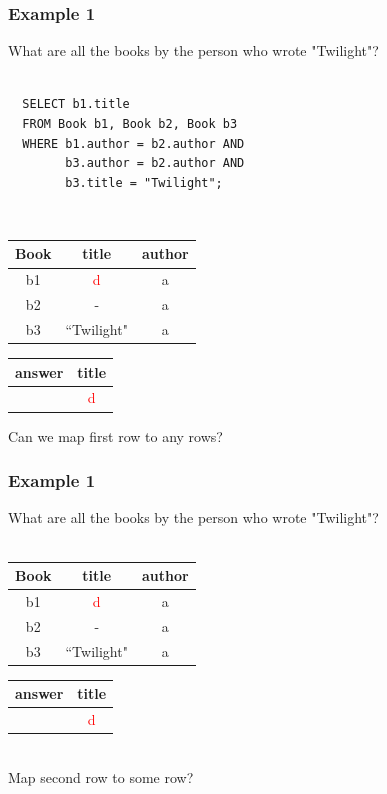 \documentclass{beamer}
\begin{document}
\begin{frame}[fragile]
  \frametitle{Example 1}
  What are all the books by the person who wrote "Twilight"?\\
  \hfill \\
\begin{verbatim} 
  SELECT b1.title
  FROM Book b1, Book b2, Book b3
  WHERE b1.author = b2.author AND
        b3.author = b2.author AND
        b3.title = "Twilight";
\end{verbatim}
  \hfill \\
  \begin{tabular}{ c | c c }
  Book & title & author \\
  \hline
   b1 & \textcolor{red}{d} & a \\
   b2 & -         & a \\
   b3 & ``Twilight" & a \\
  \end{tabular}
  \begin{tabular}{ c | c}
  answer & title \\
  \hline
   & \textcolor{red}{d}\\
  \end{tabular}

  Can we map first row to any rows?
\end{frame}

\begin{frame}
  \frametitle{Example 1}
  What are all the books by the person who wrote "Twilight"?\\
  \hfill \\
  \begin{tabular}{ c | c c }
  Book & title & author \\
  \hline
   b1 & \textcolor{red}{d} & a \\
   b2 & -         & a \\
   b3 & ``Twilight" & a \\
  \end{tabular}
  \begin{tabular}{ c | c}
  answer & title \\
  \hline
   & \textcolor{red}{d}\\
  \end{tabular}
  \hfill \\
  Map second row to some row?
\end{frame}
\end{document}
